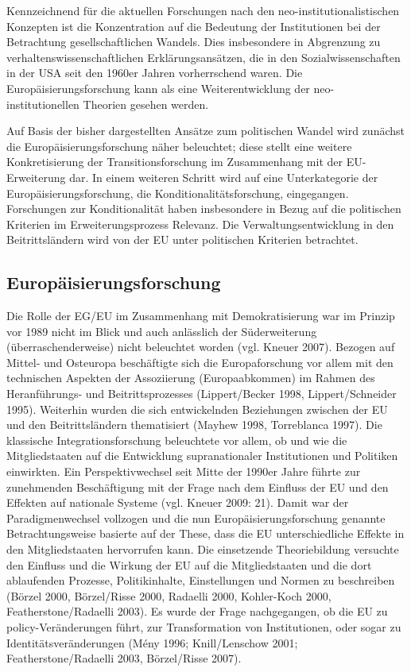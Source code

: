 Kennzeichnend für die aktuellen Forschungen nach den neo-institutionalistischen Konzepten ist die Konzentration auf die Bedeutung der Institutionen bei der Betrachtung gesellschaftlichen Wandels. Dies insbesondere in Abgrenzung zu verhaltenswissenschaftlichen Erklärungsansätzen, die in den Sozialwissenschaften in der USA seit den 1960er Jahren vorherrschend waren. Die Europäisierungsforschung kann als eine Weiterentwicklung der neo-institutionellen Theorien gesehen werden. \par
Auf Basis der bisher dargestellten Ansätze zum politischen Wandel wird zunächst die Europäisierungsforschung näher beleuchtet; diese stellt eine weitere Konkretisierung der Transitionsforschung im Zusammenhang mit der EU-Erweiterung dar. In einem weiteren Schritt wird auf eine Unterkategorie der Europäisierungsforschung, die Konditionalitätsforschung, eingegangen. Forschungen zur Konditionalität haben insbesondere in Bezug auf die politischen Kriterien im Erweiterungsprozess Relevanz. Die Verwaltungsentwicklung in den Beitrittsländern wird von der EU unter politischen Kriterien betrachtet. 
\subsection{Europäisierungsforschung}
Die Rolle der EG/EU im Zusammenhang mit Demokratisierung war im Prinzip vor 1989 nicht im Blick und auch anlässlich der Süderweiterung (überraschenderweise) nicht beleuchtet worden (vgl. Kneuer 2007). Bezogen auf Mittel- und Osteuropa beschäftigte sich die Europaforschung vor allem mit den technischen Aspekten der Assoziierung (Europaabkommen) im Rahmen des Heranführungs- und Beitrittsprozesses (Lippert/Becker 1998, Lippert/Schneider 1995). Weiterhin wurden die sich entwickelnden Beziehungen zwischen der EU und den Beitrittsländern thematisiert (Mayhew 1998, Torreblanca 1997). Die klassische Integrationsforschung beleuchtete vor allem, ob und wie die Mitgliedstaaten auf die Entwicklung supranationaler Institutionen und Politiken einwirkten. Ein Perspektivwechsel seit Mitte der 1990er Jahre führte zur zunehmenden Beschäftigung mit der Frage nach dem Einfluss der EU und den Effekten auf nationale Systeme (vgl. Kneuer 2009: 21). Damit war der Paradigmenwechsel vollzogen und die nun Europäisierungsforschung genannte Betrachtungsweise basierte auf der These, dass die EU unterschiedliche Effekte in den Mitgliedstaaten hervorrufen kann. Die einsetzende Theoriebildung versuchte den Einfluss und die Wirkung der EU auf die Mitgliedstaaten und die dort ablaufenden Prozesse, Politikinhalte, Einstellungen und Normen zu beschreiben (Börzel 2000, Börzel/Risse 2000, Radaelli 2000, Kohler-Koch 2000, Featherstone/Radaelli 2003). Es wurde der Frage nachgegangen, ob die EU zu policy-Veränderungen führt, zur Transformation von Institutionen, oder sogar zu Identitätsveränderungen (Mény 1996; Knill/Lenschow 2001; Featherstone/Radaelli 2003, Börzel/Risse 2007). \par


